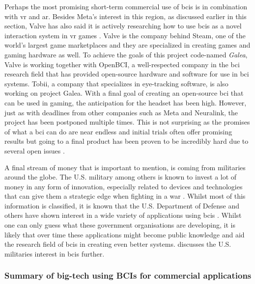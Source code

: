 Perhaps the most promising short-term commercial use of \glspl{bci} is in combination with \gls{vr} and \gls{ar}.
Besides Meta's interest in this region, as discussed earlier in this section, Valve has also said it is actively researching how to use \glspl{bci} as a novel interaction system in \gls{vr} games \citep{valve_bci_interest}.
Valve is the company behind Steam, one of the world's largest game marketplaces and they are specialized in creating games and gaming hardware as well.
To achieve the goals of this project code-named \textit{Galea}, Valve is working together with OpenBCI, a well-respected company in the \gls{bci} research field that has provided open-source hardware and software for use in \gls{bci} systems.
Tobii, a company that specializes in eye-tracking software, is also working on project Galea.
With a final goal of creating an open-source \gls{bci} that can be used in gaming, the anticipation for the headset has been high.
However, just as with deadlines from other companies such as Meta and Neuralink, the project has been postponed multiple times.
This is not surprising as the promises of what a \gls{bci} can do are near endless and initial trials often offer promising results but going to a final product has been proven to be incredibly hard due to several open issues \citep{bci_review_arnau}.

A final stream of money that is important to mention, is coming from militaries around the globe.
The U.S. military among others is known to invest a lot of money in any form of innovation, especially related to devices and technologies that can give them a strategic edge when fighting in a war \citep[with examples of funds for AI research in][]{military_ai_money, military_ai_money_eu}.
Whilst most of this information is classified, it is known that the U.S. Department of Defense and others have shown interest in a wide variety of applications using \glspl{bci} \citep{bci_military}.
Whilst one can only guess what these government organisations are developing, it is likely that over time these applications might become public knowledge and aid the research field of \glspl{bci} in creating even better systems.
 discusses the U.S. militaries interest in \glspl{bci} further.


\subsubsection{Summary of big-tech using BCIs for commercial applications}
\label{subsubsec:bci_gaining_popularity_big_tech_summary}

